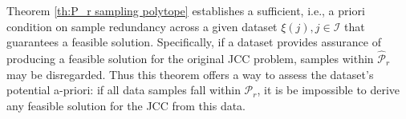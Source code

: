 Theorem \ref{th:P_r sampling polytope} establishes a sufficient, i.e., a priori condition on sample redundancy across a given dataset $\xi(j), j \in \mathcal{I}$ that guarantees a feasible solution. Specifically, if a dataset provides assurance of producing a feasible solution for the original JCC problem, samples within $\hat{\mathcal{P}}_r$ may be disregarded. Thus this theorem offers a way to assess the dataset's potential a-priori: if all data samples fall within $\mathcal{P}_r$, it is be impossible to derive any feasible solution for the JCC from this data.

